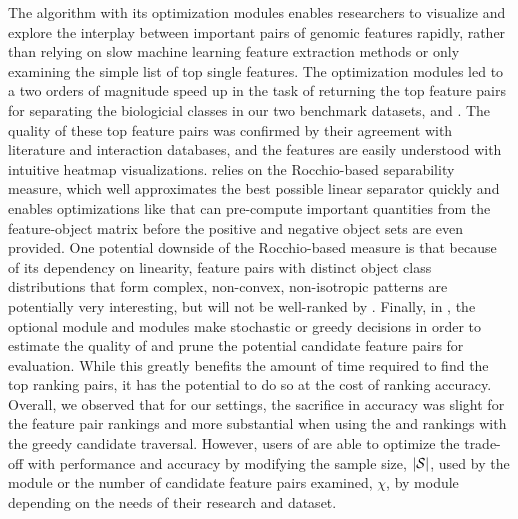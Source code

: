 The \genviz algorithm with its optimization modules enables researchers to
visualize and explore the interplay between important pairs of genomic features
rapidly, rather than relying on slow machine learning feature extraction methods
or only examining the simple list of top single features.  The optimization
modules led to a two orders of magnitude speed up in the task of returning the
top feature pairs for separating the biologicial classes in our two
benchmark datasets, \msig and \lincs. The quality of these top feature pairs
was confirmed by their agreement with literature and interaction databases,
and the features are easily understood with intuitive heatmap visualizations.
\genviz relies on the Rocchio-based separability measure, which well
approximates the best possible linear separator quickly and enables
optimizations like \trans that can pre-compute important quantities from the
feature-object matrix before the positive and negative object sets are even
provided. One potential downside of the Rocchio-based measure is
that because of its dependency on linearity, feature pairs with distinct
object class distributions that form complex, non-convex, non-isotropic
patterns are potentially very interesting, but will not be well-ranked by
\genviz. Finally, in \genviz, the optional \sampling module and \traversal
modules make stochastic or greedy decisions in order to estimate the quality of
and prune the potential candidate feature pairs for evaluation.  While this
greatly benefits the amount of time required to find the top ranking pairs, it
has the potential to do so at the cost of ranking accuracy. Overall, we observed
that for our settings, the sacrifice in accuracy was slight for the \sampOpt
feature pair rankings and more substantial when using the \horiz and \vertic
rankings with the greedy candidate traversal.  However, users of \genviz are
able to optimize the trade-off with performance and accuracy by modifying the
sample size, $|{\mathcal{S}}|$, used by the \sampling module or the number of candidate
feature pairs examined, $\chi$, by \traversal module depending on the needs of
their research and dataset.




